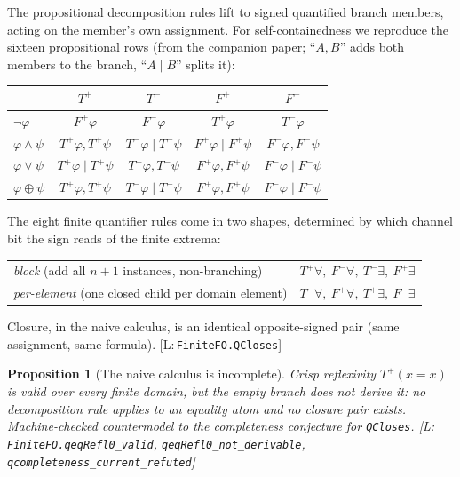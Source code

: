 \documentclass[11pt,a4paper]{article}
\newtheorem{proposition}[theorem]{Proposition}
\theoremstyle{definition}
\newcommand{\hmz}{\oplus}
\newcommand{\Tp}{T^{+}}\newcommand{\Tm}{T^{-}}
\newcommand{\Fp}{F^{+}}\newcommand{\Fm}{F^{-}}
\newcommand{\lean}[1]{\texttt{#1}}
\begin{document}
The propositional decomposition rules lift to signed quantified branch
members, acting on the member's own assignment. For self-containedness we
reproduce the sixteen propositional rows (from the companion paper;
``$A,B$'' adds both members to the branch, ``$A\mid B$'' splits it):

\begin{center}
\begin{tabular}{lcccc}
\toprule
 & $\Tp$ & $\Tm$ & $\Fp$ & $\Fm$ \\
\midrule
$\lnot\varphi$ & $\Fp\varphi$ & $\Fm\varphi$ & $\Tp\varphi$ & $\Tm\varphi$ \\
$\varphi\wedge\psi$ & $\Tp\varphi,\Tp\psi$ & $\Tm\varphi\mid\Tm\psi$
  & $\Fp\varphi\mid\Fp\psi$ & $\Fm\varphi,\Fm\psi$ \\
$\varphi\vee\psi$ & $\Tp\varphi\mid\Tp\psi$ & $\Tm\varphi,\Tm\psi$
  & $\Fp\varphi,\Fp\psi$ & $\Fm\varphi\mid\Fm\psi$ \\
$\varphi\hmz\psi$ & $\Tp\varphi,\Tp\psi$ & $\Tm\varphi\mid\Tm\psi$
  & $\Fp\varphi,\Fp\psi$ & $\Fm\varphi\mid\Fm\psi$ \\
\bottomrule
\end{tabular}
\end{center}

The eight finite quantifier rules come in two shapes, determined by which
channel bit the sign reads of the finite extrema:

\begin{center}\small
\begin{tabular}{ll}
\toprule
\emph{block} (add all $n{+}1$ instances, non-branching) &
$\Tp\forall,\ \Fm\forall,\ \Tm\exists,\ \Fp\exists$ \\
\emph{per-element} (one closed child per domain element) &
$\Tm\forall,\ \Fp\forall,\ \Tp\exists,\ \Fm\exists$ \\
\bottomrule
\end{tabular}
\end{center}

Closure, in the naive calculus, is an identical opposite-signed pair (same
assignment, same formula). [L:\,\lean{FiniteFO.QCloses}]

\begin{proposition}[The naive calculus is incomplete]\label{prop:naive}
Crisp reflexivity $\Tp(x{=}x)$ is valid over every finite domain, but the
empty branch does not derive it: no decomposition rule applies to an
equality atom and no closure pair exists. Machine-checked countermodel to
the completeness conjecture for \lean{QCloses}.
[L:\,\lean{FiniteFO.qeqRefl0\_valid},
\lean{qeqRefl0\_not\_derivable},
\lean{qcompleteness\_current\_refuted}]
\end{proposition}
\end{document}
